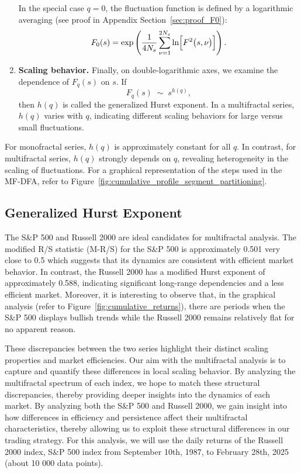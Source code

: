 \documentclass[11pt]{extarticle}
\begin{document}
\begin{enumerate}
    In the special case \(q=0\), the fluctuation function is defined by a logarithmic averaging (see proof in Appendix Section~\ref{sec:proof_F0}):
    \begin{equation}
        F_0(s) = \exp\left(\frac{1}{4N_s} \sum_{\nu=1}^{2N_s} \ln\Bigl[F^2\bigl(s,\nu\bigr)\Bigr]\right).
    \end{equation}


    \item \textbf{Scaling behavior.} Finally, on double-logarithmic axes, we examine the dependence of \(F_q(s)\) on \(s\). If
    \begin{equation}
        F_q(s) \;\sim\; s^{h(q)},
    \end{equation}
    then \(h(q)\) is called the generalized Hurst exponent. In a multifractal series, \(h(q)\) varies with \(q\),
    indicating different scaling behaviors for large versus small fluctuations.
\end{enumerate}

For monofractal series, \(h(q)\) is approximately constant for all \(q\). In contrast, for multifractal
series, \(h(q)\) strongly depends on \(q\), revealing heterogeneity in the scaling of fluctuations.
For a graphical representation of the steps used in the MF-DFA, refer to Figure~\ref{fig:cumulative_profile_segment_partitioning}.

\subsection{Generalized Hurst Exponent}
\label{subsec:gen_hurst}

The S\&P 500 and Russell 2000 are ideal candidates for multifractal analysis.
The modified R/S statistic (M-R/S) for the S\&P 500 is approximately 0.501 very close to 0.5 which suggests that its
dynamics are consistent with efficient market behavior. In contrast, the Russell 2000 has a modified Hurst exponent of
approximately 0.588, indicating significant long-range dependencies and a less efficient market. Moreover, it is interesting
to observe that, in the graphical analysis (refer to Figure~\ref{fig:cumulative_returns}), there are periods when the S\&P 500
displays bullish trends while the Russell 2000 remains relatively flat for no apparent reason.

These discrepancies between the two series highlight their distinct scaling properties and market efficiencies. Our aim with
the multifractal analysis is to capture and quantify these differences in local scaling behavior. By analyzing the multifractal spectrum
of each index, we hope to match these structural discrepancies, thereby providing deeper insights into the dynamics of each market.
By analyzing both the S\&P 500 and Russell 2000, we gain insight into how differences in efficiency and persistence
affect their multifractal characteristics, thereby allowing us to exploit these structural differences in our trading strategy.
For this analysis, we will use the daily returns of the Russell 2000 index, S\&P 500 index from September 10th, 1987, to February 28th, 2025 (about 10 000 data points).
\end{document}
